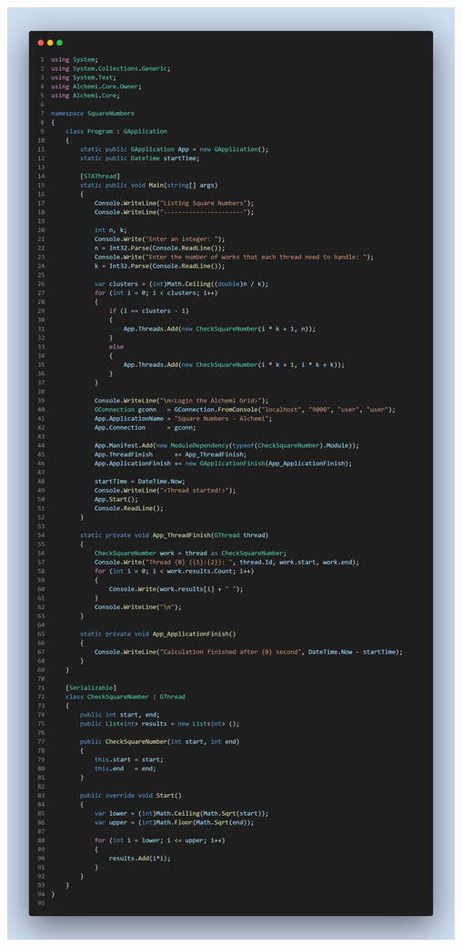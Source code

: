 \documentclass[12pt,a4paper]{report}
\begin{document}
\begin{center}
\includegraphics[trim=0in 0in 0in 22.8in, clip, scale=.23]{./Figures/SquareNumbers/SquareNumbers}
\clearpage
\end{center}
\end{document}
